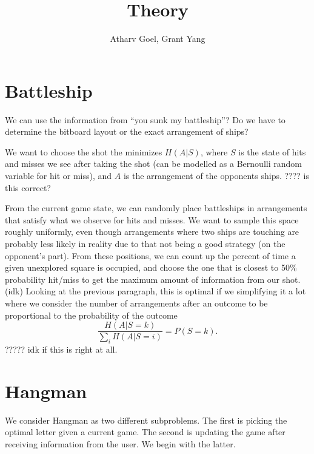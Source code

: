 



    \title{Theory}
    \author{Atharv Goel, Grant Yang}
    \maketitle

    \section{Battleship}

    We can use the information from ``you sunk my battleship''? Do we have to determine the bitboard layout or the exact arrangement of ships?

    We want to choose the shot the minimizes $H(A | S)$, where $S$ is the state of hits and misses we see after taking the shot (can be modelled as a Bernoulli random variable for hit or miss), and $A$ is the arrangement of the opponents ships. ???? is this correct?

    From the current game state, we can randomly place battleships in arrangements that satisfy what we observe for hits and misses. We want to sample this space roughly uniformly, even though arrangements where two ships are touching are probably less likely in reality due to that not being a good strategy (on the opponent's part). From these positions, we can count up the percent of time a given unexplored square is occupied, and choose the one that is closest to 50\% probability hit/miss to get the maximum amount of information from our shot. (idk) Looking at the previous paragraph, this is optimal if we simplifying it a lot where we consider the number of arrangements after an outcome to be proportional to the probability of the outcome \[\frac{H(A | S = k)}{\sum_i H(A | S = i)} = P(S=k).\] ????? idk if this is right at all. 

    \newpage

    \section{Hangman}

    We consider Hangman as two different subproblems. The first is picking the optimal letter given a current game. The second is updating the game after receiving information from the user. We begin with the latter.
    

